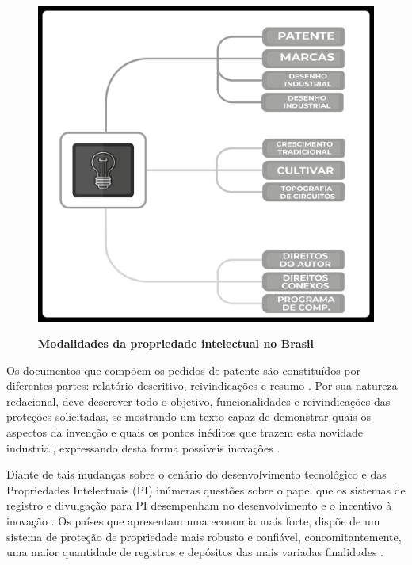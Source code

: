 \begin{figure}[H]
\centering
\caption{\textbf{Modalidades da propriedade intelectual no Brasil}}
\includegraphics[scale=0.1]{Imagens/propriedade_intelectual.png}
\label{figura_4}
\end{figure}


Os documentos que compõem os pedidos de patente são constituídos por diferentes partes: relatório descritivo, reivindicações e resumo \cite{inpi_diretrizes_2011}. Por sua natureza redacional, deve descrever todo o objetivo, funcionalidades e reivindicações das proteções solicitadas, se mostrando um texto capaz de demonstrar quais os aspectos da invenção e quais os pontos inéditos que trazem esta novidade industrial, expressando desta forma possíveis inovações \cite{wipo_global_2018}.  


Diante de tais mudanças sobre o cenário do desenvolvimento tecnológico e das Propriedades Intelectuais (PI) inúmeras questões sobre o papel que os sistemas de registro e divulgação para PI desempenham no desenvolvimento e o incentivo à inovação \cite{segala_os_2016}. Os países que apresentam uma economia mais forte, dispõe de um sistema de proteção de propriedade mais robusto e confiável, concomitantemente, uma maior quantidade de registros e depósitos das mais variadas finalidades \cite{mueller_universidades_2014}.



